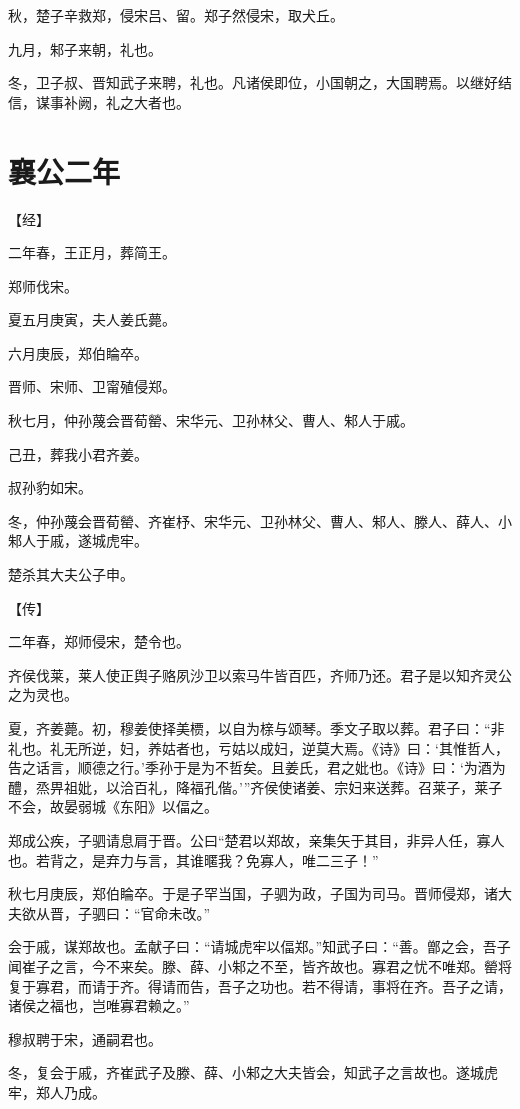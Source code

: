 \documentclass[a4paper,12pt,UTF8,twoside]{ctexbook}
\begin{document}
秋，楚子辛救郑，侵宋吕、留。郑子然侵宋，取犬丘。

九月，邾子来朝，礼也。

冬，卫子叔、晋知武子来聘，礼也。凡诸侯即位，小国朝之，大国聘焉。以继好结信，谋事补阙，礼之大者也。


\section{襄公二年}



【经】

二年春，王正月，葬简王。

郑师伐宋。

夏五月庚寅，夫人姜氏薨。

六月庚辰，郑伯睔卒。

晋师、宋师、卫甯殖侵郑。

秋七月，仲孙蔑会晋荀罃、宋华元、卫孙林父、曹人、邾人于戚。

己丑，葬我小君齐姜。

叔孙豹如宋。

冬，仲孙蔑会晋荀罃、齐崔杼、宋华元、卫孙林父、曹人、邾人、滕人、薛人、小邾人于戚，遂城虎牢。

楚杀其大夫公子申。

【传】

二年春，郑师侵宋，楚令也。

齐侯伐莱，莱人使正舆子赂夙沙卫以索马牛皆百匹，齐师乃还。君子是以知齐灵公之为灵也。

夏，齐姜薨。初，穆姜使择美槚，以自为榇与颂琴。季文子取以葬。君子曰：“非礼也。礼无所逆，妇，养姑者也，亏姑以成妇，逆莫大焉。《诗》曰：‘其惟哲人，告之话言，顺德之行。’季孙于是为不哲矣。且姜氏，君之妣也。《诗》曰：‘为酒为醴，烝畀祖妣，以洽百礼，降福孔偕。’”齐侯使诸姜、宗妇来送葬。召莱子，莱子不会，故晏弱城《东阳》以偪之。

郑成公疾，子驷请息肩于晋。公曰“楚君以郑故，亲集矢于其目，非异人任，寡人也。若背之，是弃力与言，其谁暱我？免寡人，唯二三子！”

秋七月庚辰，郑伯睔卒。于是子罕当国，子驷为政，子国为司马。晋师侵郑，诸大夫欲从晋，子驷曰：“官命未改。”

会于戚，谋郑故也。孟献子曰：“请城虎牢以偪郑。”知武子曰：“善。鄫之会，吾子闻崔子之言，今不来矣。滕、薛、小邾之不至，皆齐故也。寡君之忧不唯郑。罃将复于寡君，而请于齐。得请而告，吾子之功也。若不得请，事将在齐。吾子之请，诸侯之福也，岂唯寡君赖之。”

穆叔聘于宋，通嗣君也。

冬，复会于戚，齐崔武子及滕、薛、小邾之大夫皆会，知武子之言故也。遂城虎牢，郑人乃成。
\end{document}
